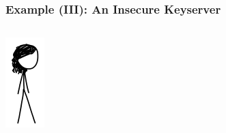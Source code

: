 \documentclass[12pt,english,dvipsnames]{beamer}
\newcommand{\red}[1]{{\color{red}#1}}
\begin{document}
\begin{frame}[fragile]
    \frametitle{Example (III): An \red{Insecure} Keyserver}

    \begin{columns}[b]
        \begin{column}{1.5cm}
        \includegraphics[width=\textwidth]{images/meg.png}
        \end{column}


\end{columns}
\end{frame}
\end{document}
